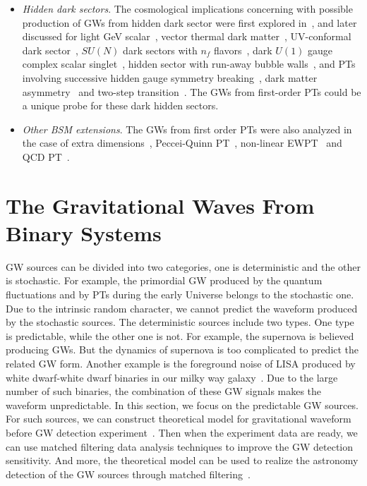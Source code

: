 \documentclass[a4paper,11pt]{article}
\begin{document}
\begin{itemize}
  \item \textit{Hidden dark sectors}. The cosmological implications concerning with possible production of GWs from hidden dark sector were first explored in~\cite{Espinosa:2008kw}, and later discussed for light GeV scalar~\cite{Das:2009ue}, vector thermal dark matter~\cite{Hambye:2013sna}, UV-conformal dark sector~\cite{Dorsch:2014qpa}, $SU(N)$ dark sectors with $n_f$ flavors~\cite{Schwaller:2015tja}, dark $U(1)$ gauge complex scalar singlet~\cite{Jaeckel:2016jlh}, hidden sector with run-away bubble walls~\cite{Katz:2016adq}, and PTs involving successive hidden gauge symmetry breaking~\cite{Huang:2017laj}, dark matter asymmetry~\cite{Baldes:2017rcu} and two-step transition~\cite{Chao:2017vrq}. The GWs from first-order PTs could be a unique probe for these dark hidden sectors.
  \item \textit{Other BSM extensions}. The GWs from first order PTs were also analyzed in the case of extra dimensions~\cite{Randall:2006py,Nardini:2007me,Konstandin:2010cd,Konstandin:2011dr},  Peccei-Quinn PT~\cite{Dev:2016feu}, non-linear EWPT~\cite{Kobakhidze:2016mch} and QCD PT~\cite{Boeckel:2009ej,Schettler:2010dp,Boeckel:2011yj,Anand:2017kar}.
\end{itemize}

\section{The Gravitational Waves From Binary Systems}
\label{sec:binary system}

GW sources can be divided into two categories, one is deterministic and the other is stochastic. For example, the primordial GW produced by the quantum fluctuations and by PTs during the early Universe belongs to the stochastic one. Due to the intrinsic random character, we cannot predict the waveform produced by the stochastic sources. The deterministic sources include two types. One type is predictable, while the other one is not. For example, the supernova is believed producing GWs. But the dynamics of supernova is too complicated to predict the related GW form. Another example is the foreground noise of LISA produced by white dwarf-white dwarf binaries in our milky way galaxy~\cite{Stroeer:2006rx,Ruiter:2007xx,Crowder:2006eu}. Due to the large number of such binaries, the combination of these GW signals makes the waveform unpredictable. In this section, we focus on the predictable GW sources. For such sources, we can construct theoretical model for gravitational waveform before GW detection experiment~\cite{cao2016numerical}. Then when the experiment data are ready, we can use matched filtering data analysis techniques to improve the GW detection sensitivity. And more, the theoretical model can be used to realize the astronomy detection of the GW sources through matched filtering~\cite{cao2016gravitational,cai2016gravitational}.
\end{document}
